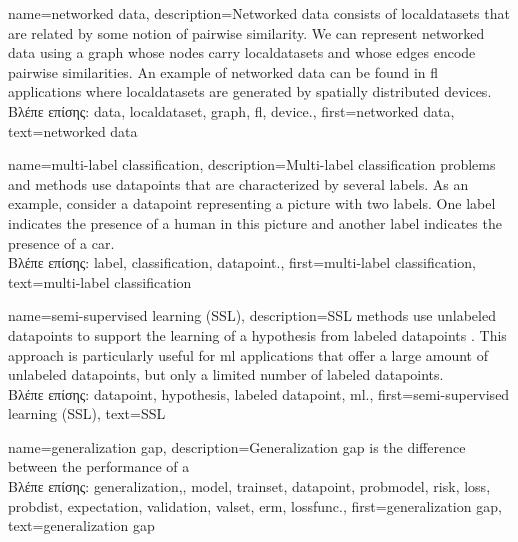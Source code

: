 {name={networked data},
	description={Networked \gls{data} consists of \gls{localdataset}s 
		that are related by some notion of pairwise similarity. We can represent networked 
		\gls{data} using a \gls{graph} whose nodes carry \gls{localdataset}s and whose edges encode 
		pairwise similarities. An example of networked \gls{data} can be found in \gls{fl} applications 
		where \gls{localdataset}s are generated by spatially distributed \gls{device}s.\\
		\foreignlanguage{greek}{Βλέπε επίσης:} \gls{data}, \gls{localdataset}, \gls{graph}, \gls{fl}, \gls{device}.}, 
	first={networked data},
	text={networked data}  
}

{name={multi-label classification}, 
	description={Multi-\gls{label} 
		\gls{classification} problems and methods use \gls{datapoint}s 
		that are characterized by several \gls{label}s. As an example, consider a \gls{datapoint} 
		representing a picture with two \gls{label}s. One \gls{label} indicates the presence of a human 
		in this picture and another \gls{label} indicates the presence of a car.\\
		\foreignlanguage{greek}{Βλέπε επίσης:} \gls{label}, \gls{classification}, \gls{datapoint}.},
	  first={multi-label classification},
	  text={multi-label classification} 
}

{name={semi-supervised learning (SSL)}, 
	description={SSL methods use unlabeled \gls{datapoint}s
		to support the learning of a \gls{hypothesis} from \gls{labeled datapoint}s \cite{SemiSupervisedBook}. 
		This approach is particularly useful for \gls{ml} applications that offer a large amount of 
		unlabeled \gls{datapoint}s, but only a limited number of \gls{labeled datapoint}s.\\
		\foreignlanguage{greek}{Βλέπε επίσης:} \gls{datapoint}, \gls{hypothesis}, \gls{labeled datapoint}, \gls{ml}.}, 
	first={semi-supervised learning (SSL)},
	text={SSL} 
}

{name={generalization gap}, 
	description={Generalization gap is the difference between the performance of a 
		\\
		\foreignlanguage{greek}{Βλέπε επίσης:} \gls{generalization},, \gls{model}, \gls{trainset}, \gls{datapoint}, 
		\gls{probmodel}, \gls{risk}, \gls{loss}, \gls{probdist}, \gls{expectation}, \gls{validation}, \gls{valset},  
		\gls{erm}, \gls{lossfunc}.}, 
	first={generalization gap}, 
	text={generalization gap}
} 
	
